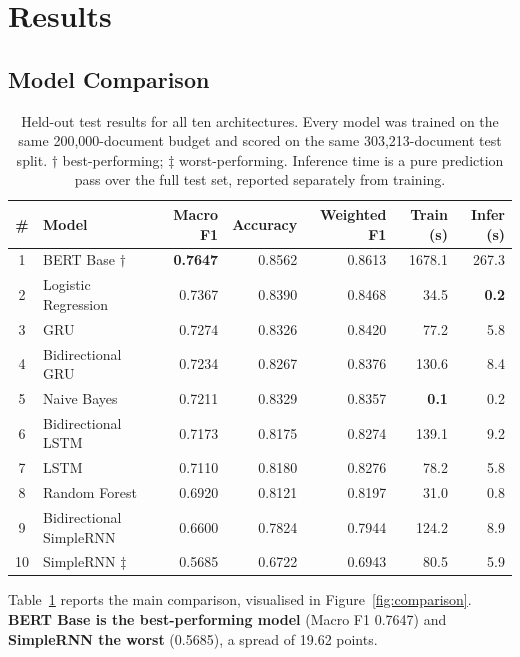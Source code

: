 \documentclass[11pt]{article}
\begin{document}
\section{Results}
\label{sec:results}

\subsection{Model Comparison}

\begin{table}[t]
\centering
\small
\begin{tabular}{clrrrrr}
\toprule
\textbf{\#} & \textbf{Model} & \textbf{Macro F1} & \textbf{Accuracy} &
\textbf{Weighted F1} & \textbf{Train (s)} & \textbf{Infer (s)} \\
\midrule
1  & BERT Base $\dagger$        & \textbf{0.7647} & 0.8562 & 0.8613 & 1678.1 & 267.3 \\
2  & Logistic Regression        & 0.7367 & 0.8390 & 0.8468 & 34.5 & \textbf{0.2} \\
3  & GRU                        & 0.7274 & 0.8326 & 0.8420 & 77.2 & 5.8 \\
4  & Bidirectional GRU          & 0.7234 & 0.8267 & 0.8376 & 130.6 & 8.4 \\
5  & Naive Bayes                & 0.7211 & 0.8329 & 0.8357 & \textbf{0.1} & 0.2 \\
6  & Bidirectional LSTM         & 0.7173 & 0.8175 & 0.8274 & 139.1 & 9.2 \\
7  & LSTM                       & 0.7110 & 0.8180 & 0.8276 & 78.2 & 5.8 \\
8  & Random Forest              & 0.6920 & 0.8121 & 0.8197 & 31.0 & 0.8 \\
9  & Bidirectional SimpleRNN    & 0.6600 & 0.7824 & 0.7944 & 124.2 & 8.9 \\
10 & SimpleRNN $\ddagger$       & 0.5685 & 0.6722 & 0.6943 & 80.5 & 5.9 \\
\bottomrule
\end{tabular}
\caption{Held-out test results for all ten architectures. Every model was
trained on the same 200{,}000-document budget and scored on the same
303{,}213-document test split. $\dagger$ best-performing; $\ddagger$
worst-performing. Inference time is a pure prediction pass over the full test
set, reported separately from training.}
\label{tab:main}
\end{table}

Table~\ref{tab:main} reports the main comparison, visualised in
Figure~\ref{fig:comparison}. \textbf{BERT Base is the best-performing model}
(Macro F1 0.7647) and \textbf{SimpleRNN the worst} (0.5685), a spread of 19.62
points.
\end{document}
